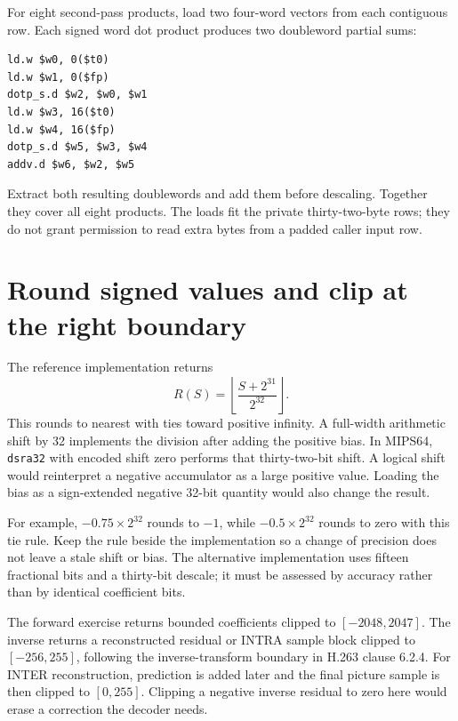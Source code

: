 For eight second-pass products, load two four-word vectors from each contiguous
row. Each signed word dot product produces two doubleword partial sums:
\begin{verbatim}
ld.w $w0, 0($t0)
ld.w $w1, 0($fp)
dotp_s.d $w2, $w0, $w1
ld.w $w3, 16($t0)
ld.w $w4, 16($fp)
dotp_s.d $w5, $w3, $w4
addv.d $w6, $w2, $w5
\end{verbatim}
Extract both resulting doublewords and add them before descaling. Together they
cover all eight products. The loads fit the private thirty-two-byte rows; they
do not grant permission to read extra bytes from a padded caller input row.

\section{Round signed values and clip at the right boundary}
The reference implementation returns
\[
 R(S)=\left\lfloor\frac{S+2^{31}}{2^{32}}\right\rfloor.
\]
This rounds to nearest with ties toward positive infinity. A full-width
arithmetic shift by 32 implements the division after adding the positive bias.
In MIPS64, \texttt{dsra32} with encoded shift zero performs that thirty-two-bit
shift. A logical shift would reinterpret a negative accumulator as a large
positive value. Loading the bias as a sign-extended negative 32-bit quantity
would also change the result.

For example, $-0.75\times2^{32}$ rounds to $-1$, while
$-0.5\times2^{32}$ rounds to zero with this tie rule. Keep the rule beside the
implementation so a change of precision does not leave a stale shift or bias.
The alternative implementation uses fifteen fractional bits and a thirty-bit
descale; it must be assessed by accuracy rather than by identical coefficient bits.

The forward exercise returns bounded coefficients clipped to $[-2048,2047]$.
The inverse returns a reconstructed residual or INTRA sample block clipped to
$[-256,255]$, following the inverse-transform boundary in H.263 clause 6.2.4.
For INTER reconstruction, prediction is added later and the final picture sample
is then clipped to $[0,255]$. Clipping a negative inverse residual to zero here
would erase a correction the decoder needs.
